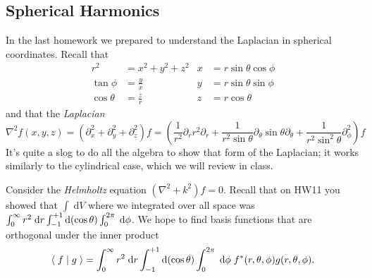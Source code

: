 \documentclass[answers]{exam}\newcommand{\repositoryInformationSetup}{     \usepackage[dvipsnames]{xcolor}     \usepackage[ angle=90, color=black, opacity=1, scale=2, ]{background}      \SetBgPosition{current page.west}      \SetBgVshift{-4.5mm}      \backgroundsetup{contents={{\color{green}\texttt{-{}-} differs from commit \texttt{f3526e2} in 0 files}}} } \newcommand{\commit}{{{\color{green}f3526e2}}}\usepackage{amsmath}
\newcommand{\oneover}[1]{\ensuremath{\frac{1}{#1}}}                             \newcommand{\inverse}{\ensuremath{^{-1}}}                                       \providecommand{\half}{\ensuremath{\frac{1}{2}} }                               \renewcommand{\half}{\ensuremath{\frac{1}{2}} }                                 \newcommand{\quarter}{\ensuremath{\frac{1}{4}} }
\newcommand{\grad}{\ensuremath{\nabla}\xspace}
\providecommand{\id}{}
\renewcommand{\id}[1]{\ensuremath{\; \mathrm{d}#1}}
\newcommand{\bracket}[2]{\ensuremath{\left\langle\;#1\;\middle|\;#2\;\right\rangle}}
\let\braket\bracket
\begin{document}
\begin{questions}
	\subsection*{Spherical Harmonics}
	\question In the last homework we prepared to understand the Laplacian in spherical coordinates.
	Recall that
	\begin{align*}
		r^2         & = x^2 + y^2 + z^2 & x & = r \sin\theta \cos\phi
		\\
		\tan \phi   & = \frac{y}{x}     & y & = r \sin\theta \sin\phi
		\\
		\cos \theta & = \frac{z}{r}     & z & = r \cos\theta
	\end{align*}
	and that the \emph{Laplacian}
	\begin{equation}
		\grad^2 f(x,y,z) = \left(\partial_x^2 + \partial_y^2 + \partial_z^2\right )f = \left(\oneover{r^2} \partial_r r^2 \partial_r + \oneover{r^2\sin\theta} \partial_\theta \sin\theta \partial_\theta + \oneover{r^2\sin^2\theta} \partial^2_\phi\right) f
	\end{equation}
	It's quite a slog to do all the algebra to show that form of the Laplacian; it works similarly to the cylindrical case, which we will review in class.

	Consider the \emph{Helmholtz} equation $(\grad^2 + k^2)f=0$.
	Recall that on HW11 you showed that $\int \id{V}$ where we integrated over all space was $\int_0^\infty r^2 \id{r} \int_{-1}^{+1}{\rm d}(\cos\theta) \int_0^{2\pi} \id{\phi}$.  We hope to find basis functions that are orthogonal under the inner product
	\begin{equation}
		\braket{f}{g} = \int_{0}^\infty r^2 \id{r} \int_{-1}^{+1} {\rm d}(\cos\theta) \int_0^{2\pi} \id{\phi}\; f^*(r,\theta,\phi) g(r,\theta,\phi).
	\end{equation}
\end{questions}
\end{document}
